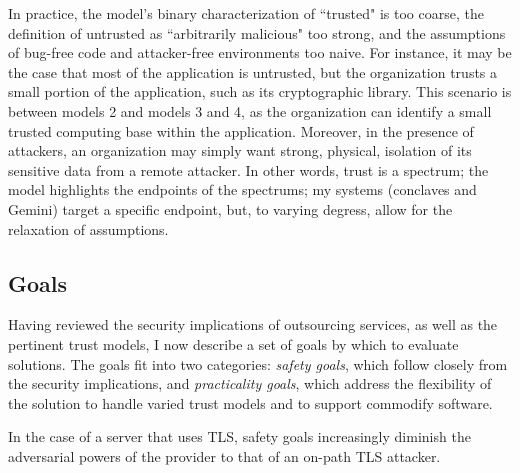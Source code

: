 In practice, the model's binary characterization of ``trusted" is too coarse,
the definition of untrusted as ``arbitrarily malicious" too strong,
and the assumptions of bug-free code and attacker-free environments too
naive.
%
For instance, it may be the case that most of the application is untrusted, but
the organization trusts a small portion of the application, such as its
cryptographic library.
%
This scenario is between models 2 and models 3 and 4, as the organization can
identify a small trusted computing base within the application.
%
Moreover, in the presence of attackers, an organization may simply
want strong, physical, isolation of its sensitive data from a remote attacker.
%
In other words, trust is a spectrum; the model highlights the endpoints of the
spectrums; my systems (conclaves and Gemini) target a specific endpoint, but,
to varying degress, allow for the relaxation of assumptions.



\subsection{Goals}

Having reviewed the security implications of outsourcing services, as well as
the pertinent trust models, I now describe a set of goals by which to evaluate
solutions.
%
The goals fit into two categories: \emph{safety goals}, which follow closely
from the security implications, and \emph{practicality goals}, which address
the flexibility of the solution to handle varied trust models and to support
commodify software.

%
In the case of a server that uses TLS, safety goals increasingly diminish the
adversarial powers of the provider to that of an on-path TLS attacker.

